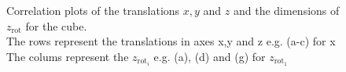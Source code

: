 \documentclass[10pt,a4paper]{article}
\newcommand{\rot}{\ensuremath{\text{rot}\xspace}}
\begin{document}
\begin{figure}[!ht]
\begin{subfigure}{0.3\textwidth}
        \caption{}
        \label{cfig_zz2}
    \end{subfigure}
    \caption{Correlation plots of the translations $x,y$ and $z$ and the dimensions of $z_{\rot}$ for the cube.\\
        The rows represent the translations in axes x,y and z e.g. (a-c) for x\\
    The colums represent the $z_{\rot_i}$ e.g. (a), (d) and (g) for $z_{\rot_1}$} \label{cube_corr_trans}
\end{figure}
\end{document}

